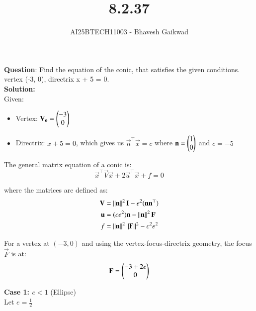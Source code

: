 \documentclass[journal]{IEEEtran}
\begin{document}

\vspace{3cm}

\title{8.2.37}
\author{AI25BTECH11003 - Bhavesh Gaikwad}
{\let\newpage\relax\maketitle}

\renewcommand{\thefigure}{\theenumi}
\renewcommand{\thetable}{\theenumi}
\setlength{\intextsep}{10pt} 


\renewcommand{\thetable}{\theenumi}


\textbf{Question}: Find the equation of the conic, that satisfies the given conditions.\\
vertex (-3, 0), directrix x + 5 = 0.\\

\textbf{Solution:}\\
Given:
\begin{itemize}
\item Vertex: $\mathbf{V_o} = \begin{pmatrix}-3 \\ 0\end{pmatrix}$
\item Directrix: $x + 5 = 0$, which gives us $\vec{n}^\top\vec{x} = c$ where $\mathbf{n} = \begin{pmatrix}1 \\ 0\end{pmatrix}$ and $c = -5$
\end{itemize}

The general matrix equation of a conic is:
\begin{equation}
\vec{x}^\top\vec{V}\vec{x} + 2\vec{u}^\top\vec{x} + f = 0
\end{equation}

where the matrices are defined as:
\begin{align}
\mathbf{V} &= \left\lVert\mathbf{n}\right\rVert^2\mathbf{I} - e^2(\mathbf{n}\mathbf{n}^\top) \\
\mathbf{u} &= (ce^2)\mathbf{n} - \left\lVert\mathbf{n}\right\rVert^2\mathbf{F} \\
f &= \left\lVert\mathbf{n}\right\rVert^2\left\lVert\mathbf{F}\right\rVert^2 - c^2e^2
\end{align}

For a vertex at $(-3, 0)$ and using the vertex-focus-directrix geometry, the focus $\vec{F}$ is at:
\begin{equation}
\mathbf{F} = \begin{pmatrix}-3 + 2e \\ 0\end{pmatrix}
\end{equation}

\newpage

\textbf{Case 1: $e < 1$} (Ellipse)\\
Let $e = \frac{1}{2}$
\end{document}
